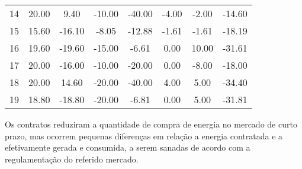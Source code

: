 \documentclass[a4paper,12pt,twoside]{article}
\begin{document}
\begin{center}
\begin{tabular}{ c c c c c c c c }
        14   & 20.00     & 9.40   & -10.00  & -40.00   & -4.00   & -2.00 & -14.60 \\
        15   & 15.60   & -16.10    & -8.05  & -12.88   & -1.61   & -1.61 & -18.19 \\
        16   & 19.60   & -19.60   & -15.00   & -6.61    & 0.00   & 10.00 & -31.61 \\
        17   & 20.00   & -16.00   & -10.00  & -20.00    & 0.00   & -8.00 & -18.00 \\
        18   & 20.00    & 14.60   & -20.00  & -40.00    & 4.00    & 5.00 & -34.40 \\
        19   & 18.80   & -18.80   & -20.00   & -6.81    & 0.00    & 5.00 & -31.81
    \end{tabular}
\end{center}

Os contratos reduziram a quantidade de compra de energia
no mercado de curto prazo, mas ocorrem pequenas diferenças
em relação a energia contratada e a efetivamente gerada e consumida,
 a serem sanadas de acordo com a regulamentação do referido mercado.
\end{document}
